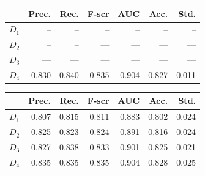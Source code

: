 \def\year{2017}\relax \documentclass[letterpaper]{article}
\begin{document}
\begin{figure}
  \end{figure}

 \begin{figure}
  \begin{minipage}[b]{0.49\textwidth}
    \centering

\begin{tabularx}{\linewidth}{l r r r r r r}
		\toprule[.2em]
		 &{\bf Prec.}& {\bf Rec.}&{\bf F-scr}&{\bf AUC}&{\bf Acc.}&{\bf Std.}\\
		\midrule
		$D_1$&--& --&-- &--&--&--\\
		$D_2$&-- &--&--- &---&---&---\\
		$D_3$&---& ---&--- &---&---&---\\
		$D_4$&0.830& 0.840&0.835 &0.904&0.827&0.011\\
		\bottomrule[.2em]
	\end{tabularx}
	 \label{tab:dnnperf}
    \end{minipage}
\hfill
  \begin{minipage}[b]{0.49\textwidth}
    \centering




\begin{tabularx}{\linewidth}{l r r r r r r}
		\toprule[.2em]
		 &{\bf Prec.}& {\bf Rec.}&{\bf F-scr}&{\bf AUC}&{\bf Acc.}&{\bf Std.}\\
		\midrule
		$D_1$&0.807& 0.815&0.811 &0.883&0.802&0.024\\
		$D_2$&0.825 &0.823&0.824 &0.891&0.816&0.024\\
		$D_3$&0.827& 0.838&0.833 &0.901&0.825&0.021\\
		$D_4$&0.835& 0.835&0.835 &0.904&0.828&0.025\\
		\bottomrule[.2em]
	\end{tabularx}
	 \label{tab:dnnperf}
  \end{minipage}
 
  \end{figure}
\end{document}
